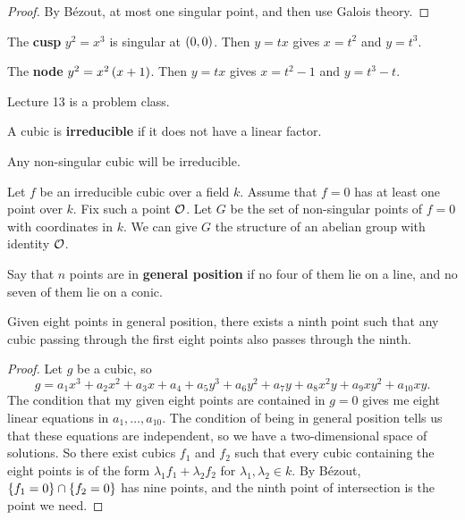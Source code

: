 \begin{proof}
By B\'ezout, at most one singular point, and then use Galois theory.
\end{proof}

\begin{example}
The \textbf{cusp} $ y^2 = x^3 $ is singular at $ \br{0, 0} $. Then $ y = tx $ gives $ x = t^2 $ and $ y = t^3 $.
\end{example}

\begin{example}
The \textbf{node} $ y^2 = x^2\br{x + 1} $. Then $ y = tx $ gives $ x = t^2 - 1 $ and $ y = t^3 - t $.
\end{example}


Lecture 13 is a problem class.

\pagebreak


A cubic is \textbf{irreducible} if it does not have a linear factor.

\begin{example*}
Any non-singular cubic will be irreducible.
\end{example*}

\begin{theorem}
\label{thm:6.7}
Let $ f $ be an irreducible cubic over a field $ k $. Assume that $ f = 0 $ has at least one point over $ k $. Fix such a point $ \mathcal{O} $. Let $ G $ be the set of non-singular points of $ f = 0 $ with coordinates in $ k $. We can give $ G $ the structure of an abelian group with identity $ \mathcal{O} $.
\end{theorem}

Say that $ n $ points are in \textbf{general position} if no four of them lie on a line, and no seven of them lie on a conic.

\begin{lemma}
\label{lem:6.8}
Given eight points in general position, there exists a ninth point such that any cubic passing through the first eight points also passes through the ninth.
\end{lemma}

\begin{proof}
Let $ g $ be a cubic, so
$$ g = a_1x^3 + a_2x^2 + a_3x + a_4 + a_5y^3 + a_6y^2 + a_7y + a_8x^2y + a_9xy^2 + a_{10}xy. $$
The condition that my given eight points are contained in $ g = 0 $ gives me eight linear equations in $ a_1, \dots, a_{10} $. The condition of being in general position tells us that these equations are independent, so we have a two-dimensional space of solutions. So there exist cubics $ f_1 $ and $ f_2 $ such that every cubic containing the eight points is of the form $ \lambda_1f_1 + \lambda_2f_2 $ for $ \lambda_1, \lambda_2 \in k $. By B\'ezout, $ \cbr{f_1 = 0} \cap \cbr{f_2 = 0} $ has nine points, and the ninth point of intersection is the point we need.
\end{proof}

